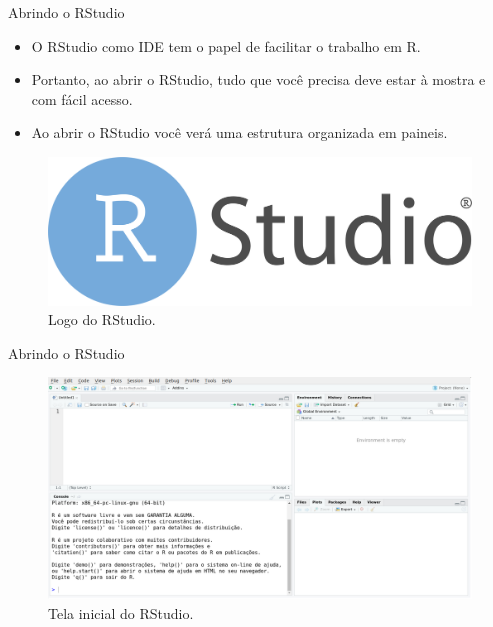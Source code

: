 \documentclass[
  ignorenonframetext,
  serif,
  professionalfont,
  usenames,
  dvipsnames,
  aspectratio = 169]{beamer}
\providecommand{\tightlist}{%
  \setlength{\itemsep}{0pt}\setlength{\parskip}{0pt}}
\renewcommand{\tightlist}{%
  \setlength{\itemsep}{0\baselineskip}
  \setlength{\parskip}{0.25\baselineskip}
}
\def\beginAHalfColumn{\begin{minipage}{0.49\textwidth}}%
\def\endColumns{\end{minipage}}%
\begin{document}
\begin{frame}{Abrindo o RStudio}
\label{abrindo-o-rstudio-1}
\beginAHalfColumn

\begin{itemize}
\tightlist
\item
  O RStudio como IDE tem o papel de facilitar o trabalho em R.
\end{itemize}

\vspace{0.3cm}

\begin{itemize}
\tightlist
\item
  Portanto, ao abrir o RStudio, tudo que você precisa deve estar à
  mostra e com fácil acesso.
\end{itemize}

\vspace{0.3cm}

\begin{itemize}
\tightlist
\item
  Ao abrir o RStudio você verá uma estrutura organizada em paineis.
\end{itemize}

\endColumns
\beginAHalfColumn

\begin{figure}

{\centering \includegraphics[width=0.6\linewidth]{./img/rstudiologo} 

}

\caption{Logo do RStudio.}\label{fig:unnamed-chunk-10}
\end{figure}

\endColumns
\end{frame}

\begin{frame}{Abrindo o RStudio}
\label{abrindo-o-rstudio-2}
\begin{figure}

{\centering \includegraphics[width=0.85\linewidth]{./img/rstudio} 

}

\caption{Tela inicial do RStudio.}\label{fig:unnamed-chunk-11}
\end{figure}
\end{frame}
\end{document}
